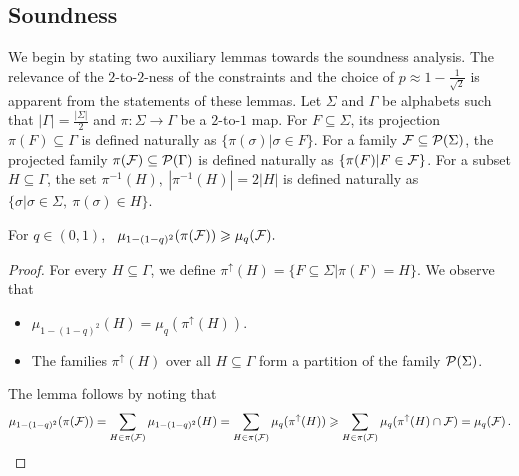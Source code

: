 \documentclass{toc}
\renewcommand\geq{\geqslant}
\begin{document}
\subsection{Soundness}\label{appendix:blc_analysis}

We begin by stating two auxiliary lemmas towards the soundness analysis. The relevance of the $2$-to-$2$-ness of the
constraints and the choice of $p \approx 1-\frac{1}{\sqrt{2}}$ is apparent from the statements of these lemmas.
Let $\Sigma$ and $\Gamma$ be alphabets such that $|\Gamma| = \frac{|\Sigma|}{2}$ and $\pi: \Sigma \to \Gamma$
be a $2$-to-$1$ map. For $F \subseteq \Sigma$, its projection $\pi(F) \subseteq \Gamma$ is defined naturally as
$\{\pi(\sigma) | \sigma \in F\}$. For a family ${\cal F} \subseteq {\cal P}(\Sigma)$, the projected family
$\pi({\cal F}) \subseteq {\cal P}(\Gamma)$ is defined naturally as $\{ \pi(F) | F \in {\cal F}\}$. For a
subset $H \subseteq \Gamma$, the set $\pi^{-1}(H), ~|\pi^{-1}(H)|= 2|H|$ is defined naturally as
$\{ \sigma | \sigma \in \Sigma, ~\pi(\sigma) \in H \}.$

\begin{lemma}\label{lem:aux-1}  For $q \in (0,1)$, ~$\mu_{1-(1-q)^2} ( \pi( {\cal F} ) ) \geq  \mu_q ( {\cal F} ). $
\end{lemma}
\begin{proof} For every $H \subseteq \Gamma$, we define $\pi^{\uparrow}(H) = \{ F \subseteq \Sigma | \pi(F) = H \}$. We observe that
\begin{itemize}
\item $\mu_{1-(1-q)^2} ( H ) =   \mu_q ( \pi^{\uparrow} (H)  ). $
\item The families $\pi^{\uparrow}(H)$ over all $H \subseteq \Gamma$
%
form a  %
%
partition of the family ${\cal P} (\Sigma)$.
\end{itemize}
The lemma follows by noting that
\[
 \mu_{1-(1-q)^2} ( \pi( {\cal F} ) ) = \sum_{H \in \pi( {\cal F} )} \mu_{1-(1-q)^2}(H) =
 \sum_{H \in \pi( {\cal F} )} \mu_q ( \pi^{\uparrow} (H)  ) \geq  \sum_{H \in \pi( {\cal F} )} \mu_q ( \pi^{\uparrow} (H) \cap {\cal F} )  =
 \mu_q ({\cal F})\,.   \qedhere%
\]
\end{proof}
\end{document}
